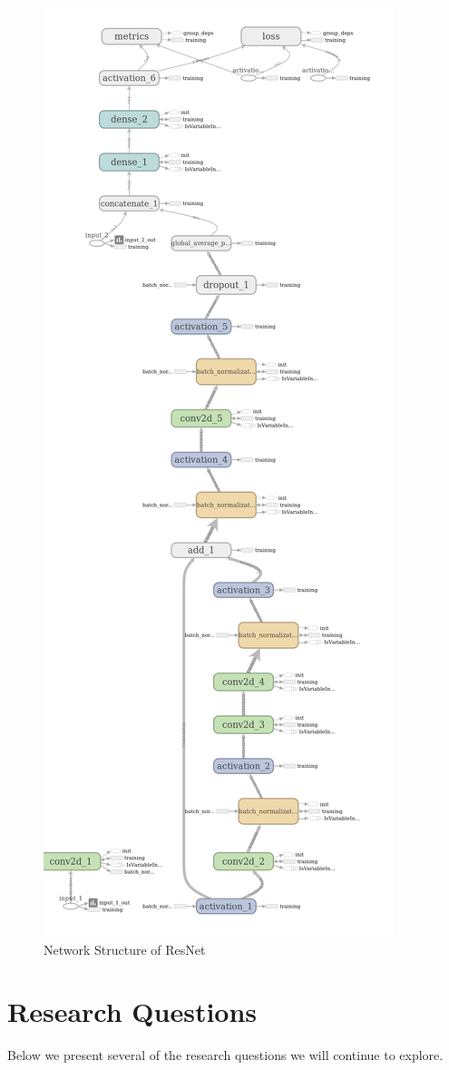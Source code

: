\documentclass[letterpaper, 10 pt, conference]{../ieeeconf}
\begin{document}
\begin{figure}[t!]
    \centering
        \includegraphics[width=0.7\columnwidth]{figs/balanced_resnet.png}
    \caption{Network Structure of ResNet} \label{fig:res_net}
\end{figure}

\section{Research Questions}
\label{sec:questions}
Below we present several of the research questions we will continue to explore. 
\end{document}
